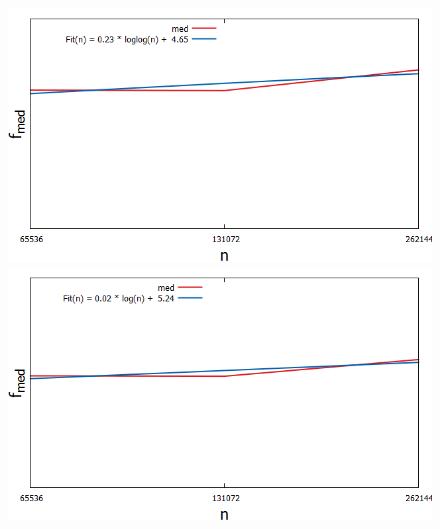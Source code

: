\begin{figure}[H]
	\hspace*{-0.4cm}
    \begin{minipage}[t]{.30\textwidth}
        \centering
		\includegraphics[width=1.15\textwidth]{pictures/med_algo_theo28_fit_med_loglog}
    \end{minipage}
    \hspace*{.6cm}
    \begin{minipage}[t]{.30\textwidth}
        \centering
        \includegraphics[width=1.15\textwidth]{pictures/med_algo_theo28_fit_med_log}
    \end{minipage}
    \hspace*{.8cm}
    \begin{minipage}[t]{.30\textwidth}
        \centering

\end{minipage}
\end{figure}
